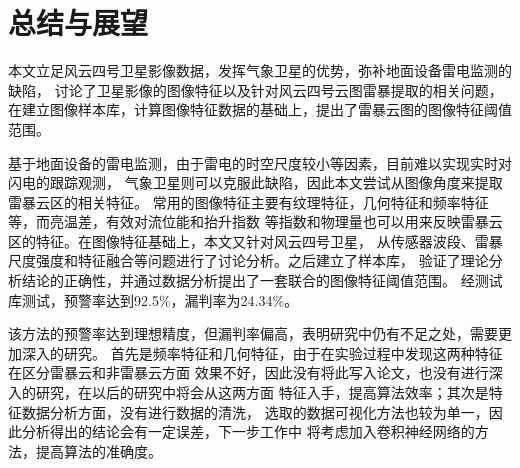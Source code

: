 
\chapter{总结与展望}
本文立足风云四号卫星影像数据，发挥气象卫星的优势，弥补地面设备雷电监测的缺陷，
讨论了卫星影像的图像特征以及针对风云四号云图雷暴提取的相关问题，
在建立图像样本库，计算图像特征数据的基础上，提出了雷暴云图的图像特征阈值范围。

基于地面设备的雷电监测，由于雷电的时空尺度较小等因素，目前难以实现实时对闪电的跟踪观测，
气象卫星则可以克服此缺陷，因此本文尝试从图像角度来提取雷暴云区的相关特征。
常用的图像特征主要有纹理特征，几何特征和频率特征等，而亮温差，有效对流位能和抬升指数
等指数和物理量也可以用来反映雷暴云区的特征。在图像特征基础上，本文又针对风云四号卫星，
从传感器波段、雷暴尺度强度和特征融合等问题进行了讨论分析。之后建立了样本库，
验证了理论分析结论的正确性，并通过数据分析提出了一套联合的图像特征阈值范围。
经测试库测试，预警率达到92.5$\%$，漏判率为24.34$\%$。

该方法的预警率达到理想精度，但漏判率偏高，表明研究中仍有不足之处，需要更加深入的研究。
首先是频率特征和几何特征，由于在实验过程中发现这两种特征在区分雷暴云和非雷暴云方面
效果不好，因此没有将此写入论文，也没有进行深入的研究，在以后的研究中将会从这两方面
特征入手，提高算法效率；其次是特征数据分析方面，没有进行数据的清洗，
选取的数据可视化方法也较为单一，因此分析得出的结论会有一定误差，下一步工作中
将考虑加入卷积神经网络的方法，提高算法的准确度。